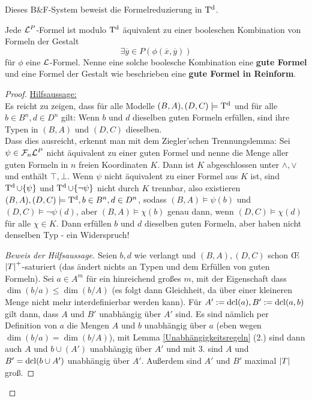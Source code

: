 Dieses B\&F-System beweist die Formelreduzierung in $\operatorname{T^d}$.
\begin{theorem}\label{Formelreduzierung}
	Jede $\mathcal{L}^P$-Formel ist modulo $\operatorname{T^d}$ äquivalent zu einer booleschen Kombination von Formeln der Gestalt
	$$\exists\overline{y}\in P(\phi(\overline{x},\overline{y}))$$
	für $\phi$ eine $\mathcal{L}$-Formel. Nenne eine solche boolesche Kombination eine \textbf{gute Formel} und eine Formel der Gestalt wie beschrieben eine \textbf{gute Formel in Reinform}.
\end{theorem}
\begin{proof}
	\underline{Hilfsaussage:}\\
	Es reicht zu zeigen, dass für alle Modelle $(B,A),(D,C)\models\operatorname{T^d}$ und für alle $b\in B^n,d\in D^n$ gilt: Wenn $b$ und $d$ dieselben guten Formeln erfüllen, sind ihre Typen in $(B,A)$ und $(D,C)$ dieselben.\\
	Dass dies ausreicht, erkennt man mit dem Ziegler'schen Trennungslemma: Sei $\psi\in\mathcal{F}_n\mathcal{L}^P$ nicht äquivalent zu einer guten Formel und nenne die Menge aller guten Formeln in $n$ freien Koordinaten $K$. Dann ist $K$ abgeschlossen unter $\land,\lor$ und enthält $\top,\bot$. Wenn $\psi$ nicht äquivalent zu einer Formel aus $K$ ist, sind $\operatorname{T^d}\cup\{\psi\}$ und $\operatorname{T^d}\cup\{\neg\psi\}$ nicht durch $K$ trennbar, also existieren $(B,A),(D,C)\models\operatorname{T^d},b\in B^n,d\in D^n$, sodass $(B,A)\models\psi(b)$ und $(D,C)\models\neg\psi(d)$, aber $(B,A)\models\chi(b)$ genau dann, wenn $(D,C)\models\chi(d)$ für alle $\chi\in K$. Dann erfüllen $b$ und $d$ dieselben guten Formeln, aber haben nicht denselben Typ - ein Widerspruch!\\
	\begin{proof}[Beweis der Hilfsaussage]
		Seien $b,d$ wie verlangt und $(B,A),(D,C)$ schon \OE\linebreak ${\left| T \right|}^+$-saturiert (das ändert nichts an Typen und dem Erfüllen von guten Formeln). Sei $a\in A^m$ für ein hinreichend großes $m$, mit der Eigenschaft dass $\dim(b/a)\leq\dim(b/A)$ (es folgt dann Gleichheit, da über einer kleineren Menge nicht mehr interdefinierbar werden kann). Für $A':=\operatorname{dcl}(a),B':=\operatorname{dcl}(a,b)$ gilt dann, dass $A$ und $B'$ unabhängig über $A'$ sind. Es sind nämlich per Definition von $a$ die Mengen $A$ und $b$ unabhängig über $a$ (eben wegen $\dim(b/a)=\dim(b/A)$), mit Lemma \ref{Unabhängigkeitsregeln} (2.) sind dann auch $A$ und $b\cup(A')$ unabhängig über $A'$ und mit 3. sind $A$ und $B'=\operatorname{dcl}(b\cup A')$ unabhängig über $A'$. Außerdem sind $A'$ und $B'$ maximal ${\left| T \right|}$ groß.\newpage

\end{proof}
\end{proof}
